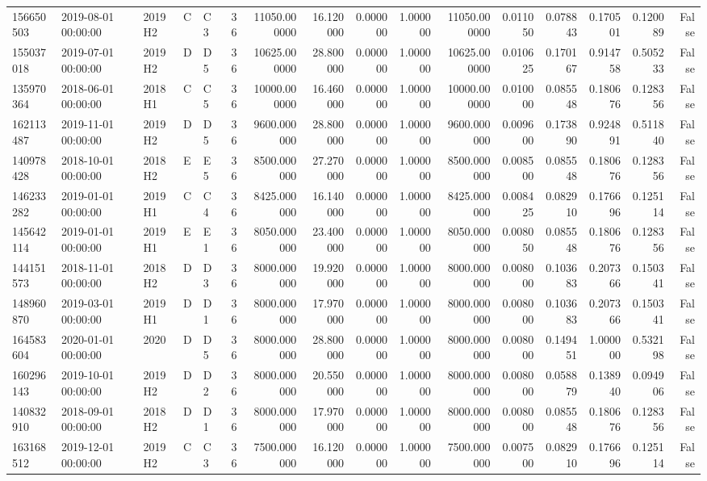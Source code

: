 \begin{tabular}{lllllrrrrrrrrrrr}
156650503 & 2019-08-01 00:00:00 & 2019H2 & C & C3 & 36 & 11050.000000 & 16.120000 & 0.000000 & 1.000000 & 11050.000000 & 0.011050 & 0.078843 & 0.170501 & 0.120089 & False \\
155037018 & 2019-07-01 00:00:00 & 2019H2 & D & D5 & 36 & 10625.000000 & 28.800000 & 0.000000 & 1.000000 & 10625.000000 & 0.010625 & 0.170167 & 0.914758 & 0.505233 & False \\
135970364 & 2018-06-01 00:00:00 & 2018H1 & C & C5 & 36 & 10000.000000 & 16.460000 & 0.000000 & 1.000000 & 10000.000000 & 0.010000 & 0.085548 & 0.180676 & 0.128356 & False \\
162113487 & 2019-11-01 00:00:00 & 2019H2 & D & D5 & 36 & 9600.000000 & 28.800000 & 0.000000 & 1.000000 & 9600.000000 & 0.009600 & 0.173890 & 0.924891 & 0.511840 & False \\
140978428 & 2018-10-01 00:00:00 & 2018H2 & E & E5 & 36 & 8500.000000 & 27.270000 & 0.000000 & 1.000000 & 8500.000000 & 0.008500 & 0.085548 & 0.180676 & 0.128356 & False \\
146233282 & 2019-01-01 00:00:00 & 2019H1 & C & C4 & 36 & 8425.000000 & 16.140000 & 0.000000 & 1.000000 & 8425.000000 & 0.008425 & 0.082910 & 0.176696 & 0.125114 & False \\
145642114 & 2019-01-01 00:00:00 & 2019H1 & E & E1 & 36 & 8050.000000 & 23.400000 & 0.000000 & 1.000000 & 8050.000000 & 0.008050 & 0.085548 & 0.180676 & 0.128356 & False \\
144151573 & 2018-11-01 00:00:00 & 2018H2 & D & D3 & 36 & 8000.000000 & 19.920000 & 0.000000 & 1.000000 & 8000.000000 & 0.008000 & 0.103683 & 0.207366 & 0.150341 & False \\
148960870 & 2019-03-01 00:00:00 & 2019H1 & D & D1 & 36 & 8000.000000 & 17.970000 & 0.000000 & 1.000000 & 8000.000000 & 0.008000 & 0.103683 & 0.207366 & 0.150341 & False \\
164583604 & 2020-01-01 00:00:00 & 2020 & D & D5 & 36 & 8000.000000 & 28.800000 & 0.000000 & 1.000000 & 8000.000000 & 0.008000 & 0.149451 & 1.000000 & 0.532198 & False \\
160296143 & 2019-10-01 00:00:00 & 2019H2 & D & D2 & 36 & 8000.000000 & 20.550000 & 0.000000 & 1.000000 & 8000.000000 & 0.008000 & 0.058879 & 0.138940 & 0.094906 & False \\
140832910 & 2018-09-01 00:00:00 & 2018H2 & D & D1 & 36 & 8000.000000 & 17.970000 & 0.000000 & 1.000000 & 8000.000000 & 0.008000 & 0.085548 & 0.180676 & 0.128356 & False \\
163168512 & 2019-12-01 00:00:00 & 2019H2 & C & C3 & 36 & 7500.000000 & 16.120000 & 0.000000 & 1.000000 & 7500.000000 & 0.007500 & 0.082910 & 0.176696 & 0.125114 & False \\

\end{tabular}

